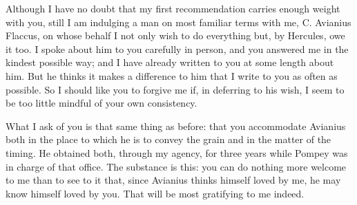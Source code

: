 

 Although I have no doubt that my first recommendation carries enough weight with you, still I am indulging a man on most familiar terms with me, C. Avianius Flaccus, on whose behalf I not only wish to do everything but, by Hercules, owe it too. I spoke about him to you carefully in person, and you answered me in the kindest possible way; and I have already written to you at some length about him. But he thinks it makes a difference to him that I write to you as often as possible. So I should like you to forgive me if, in deferring to his wish, I seem to be too little mindful of your own consistency.

 What I ask of you is that same thing as before: that you accommodate Avianius both in the place to which he is to convey the grain and in the matter of the timing. He obtained both, through my agency, for three years while Pompey was in charge of that office. The substance is this: you can do nothing more welcome to me than to see to it that, since Avianius thinks himself loved by me, he may know himself loved by you. That will be most gratifying to me indeed.
